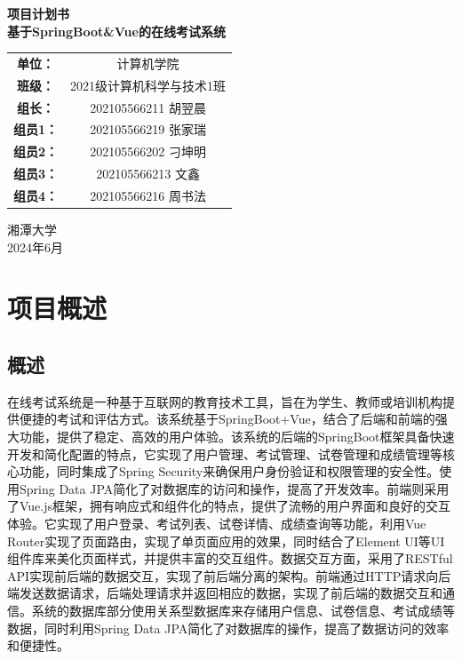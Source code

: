\documentclass{article}
\begin{document}
\begin{titlepage}
    \begin{center}
        \bfseries\Huge{项目计划书}\\
        \vspace{0.5cm}
        \bfseries\Large{基于SpringBoot\&Vue的在线考试系统}
        \vspace{5cm}
        \begin{center}\Large\linespread{2}
        \renewcommand\arraystretch{1.6}
        \begin{tabular}{cc}
            \bfseries{单位：} & 计算机学院\\ \cline{2-2}
            \bfseries{班级：} & 2021级计算机科学与技术1班\\ \cline{2-2}
            \bfseries{组长：} & 202105566211 胡翌晨\\ \cline{2-2}
            \bfseries{组员1：} & 202105566219 张家瑞\\ \cline{2-2}
            \bfseries{组员2：} & 202105566202 刁坤明\\ \cline{2-2}
            \bfseries{组员3：} & 202105566213 文鑫\\ \cline{2-2}
            \bfseries{组员4：} & 202105566216 周书法\\ \cline{2-2}
        \end{tabular}
        \end{center}
        \vspace{2cm}
        \Large{湘潭大学\\2024年6月}
    \end{center}
    \thispagestyle{empty}
    \restoregeometry
\end{titlepage}

\newpage
\tableofcontents
\newpage

\section{项目概述}

\subsection{概述}
在线考试系统是一种基于互联网的教育技术工具，旨在为学生、教师或培训机构提供便捷的考试和评估方式。该系统基于SpringBoot+Vue，结合了后端和前端的强大功能，提供了稳定、高效的用户体验。该系统的后端的SpringBoot框架具备快速开发和简化配置的特点，它实现了用户管理、考试管理、试卷管理和成绩管理等核心功能，同时集成了Spring Security来确保用户身份验证和权限管理的安全性。使用Spring Data JPA简化了对数据库的访问和操作，提高了开发效率。前端则采用了Vue.js框架，拥有响应式和组件化的特点，提供了流畅的用户界面和良好的交互体验。它实现了用户登录、考试列表、试卷详情、成绩查询等功能，利用Vue Router实现了页面路由，实现了单页面应用的效果，同时结合了Element UI等UI组件库来美化页面样式，并提供丰富的交互组件。数据交互方面，采用了RESTful API实现前后端的数据交互，实现了前后端分离的架构。前端通过HTTP请求向后端发送数据请求，后端处理请求并返回相应的数据，实现了前后端的数据交互和通信。系统的数据库部分使用关系型数据库来存储用户信息、试卷信息、考试成绩等数据，同时利用Spring Data JPA简化了对数据库的操作，提高了数据访问的效率和便捷性。
\end{document}
